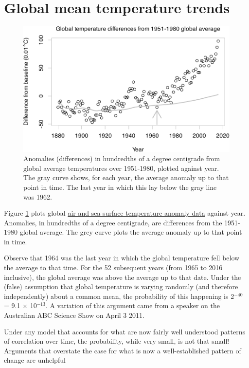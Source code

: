 \documentclass[
  10pt,
  b5paper]{book}
\begin{document}
\hypertarget{global-mean-temperature-trends}{%
\section{Global mean temperature trends}\label{global-mean-temperature-trends}}

\begin{figure}[H]

{\centering \includegraphics[width=0.8\linewidth]{08-observational_files/figure-latex/climate-1} 

}

\caption{Anomalies (differences) in hundredths of a degree centigrade
from global average temperatures over 1951-1980, plotted against year.
The gray curve shows, for each year, the average anomaly up to that
point in time.  The last year in which this lay below the gray line
was 1962.}\label{fig:climate}
\end{figure}

Figure \ref{fig:climate} plots global
\href{http://iridl.ldeo.columbia.edu/SOURCES/.NASA/.GISS/.GISSTEMP/.Global/.LOTI/}{air and sea surface temperature anomaly data}
against year. Anomalies, in hundredths of a degree centigrade, are
differences from the 1951-1980 global average. The grey curve plots
the average anomaly up to that point in time.

Observe that 1964 was the last year in which the global
temperature fell below the average to that time.
For the 52 subsequent years (from 1965 to 2016 inclusive),
the global average was above the average up to that date. Under
the (false) assumption that global temperature is varying
randomly (and therefore independently) about a common mean,
the probability of this happening is 2\(^{-40}\) = 9.1
\(\times\) 10\(^{-13}\). A variation of this argument came
from a speaker on the Australian ABC Science Show on April
3 2011.

Under any model that accounts for what are now
fairly well understood patterns of correlation over time,
the probability, while very small, is not that small!
Arguments that overstate the case for what is now a
well-established pattern of change are unhelpful
\end{document}
